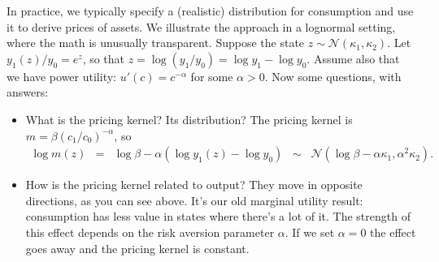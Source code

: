 \documentclass[11pt]{article}
\begin{document}
In practice, we typically specify a (realistic) distribution for consumption
and use it to derive prices of assets.
We illustrate the approach in a lognormal setting, where the math is unusually transparent.
Suppose the state $z \sim \mathcal{N}(\kappa_1,\kappa_2)$.
Let $y_1(z)/y_0 = e^z$, so that $z = \log (y_1/y_0) = \log y_1 - \log y_0$.
Assume also that we have power utility:
$u'(c) = c^{-\alpha}$ for some $\alpha > 0$.
Now some questions, with answers:
\begin{itemize}
\item What is the pricing kernel?  Its distribution?
The pricing kernel is $m = \beta (c_1/c_0)^{-\alpha}$, so
\begin{eqnarray*}
    \log m(z) &=& \log \beta - \alpha (\log y_1(z) - \log y_0)
            \;\;\sim \;\; \mathcal{N}(\log \beta - \alpha \kappa_1, \alpha^2 \kappa_2) .
\end{eqnarray*}
\item How is the pricing kernel related to output?  They move in opposite directions,
as you can see above.
It's our old marginal utility result:  consumption has less value in states where there's a lot of it.
The strength of this effect depends on the risk aversion parameter $\alpha$.
If we set $\alpha = 0$ the effect goes away and the pricing kernel is constant.


\end{itemize}
\end{document}
